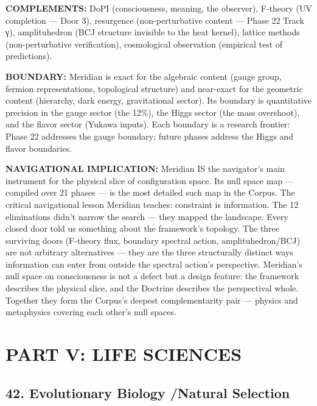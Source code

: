 \textbf{COMPLEMENTS:} DoPI (consciousness, meaning, the observer), F-theory (UV completion — Door 3), resurgence (non-perturbative content — Phase 22 Track γ), amplituhedron (BCJ structure invisible to the heat kernel), lattice methods (non-perturbative verification), cosmological observation (empirical test of predictions).


\textbf{BOUNDARY:} Meridian is exact for the algebraic content (gauge group, fermion representations, topological structure) and near-exact for the geometric content (hierarchy, dark energy, gravitational sector). Its boundary is quantitative precision in the gauge sector (the 12\%), the Higgs sector (the mass overshoot), and the flavor sector (Yukawa inputs). Each boundary is a research frontier: Phase 22 addresses the gauge boundary; future phases address the Higgs and flavor boundaries.


\textbf{NAVIGATIONAL IMPLICATION:} Meridian IS the navigator's main instrument for the physical slice of configuration space. Its null space map — compiled over 21 phases — is the most detailed such map in the Corpus. The critical navigational lesson Meridian teaches: constraint is information. The 12 eliminations didn't narrow the search — they mapped the landscape. Every closed door told us something about the framework's topology. The three surviving doors (F-theory flux, boundary spectral action, amplituhedron/\allowbreak BCJ) are not arbitrary alternatives — they are the three structurally distinct ways information can enter from outside the spectral action's perspective. Meridian's null space on consciousness is not a defect but a design feature: the framework describes the physical slice, and the Doctrine describes the perspectival whole. Together they form the Corpus's deepest complementarity pair — physics and metaphysics covering each other's null spaces.


\bigskip\noindent\makebox[\textwidth]{\color{rulegray}\rule{5cm}{0.3pt}}\bigskip


\section*{PART V: LIFE SCIENCES}


\subsection*{42. Evolutionary Biology /\allowbreak  Natural Selection}


